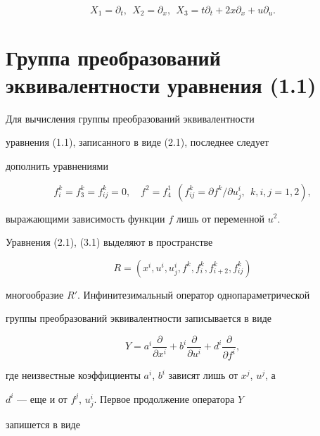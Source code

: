 $$ 


X_1=\partial_t,\ \ X_2=\partial_x,\ \ X_3=t\partial_t+ 


2x\partial_x+u\partial_u. 


$$ 


 


 


\section{Группа преобразований эквивалентности уравнения (1.1)} 


 


Для вычисления группы преобразований эквивалентности 


уравнения (1.1), записанного в виде (2.1), последнее следует 


дополнить уравнениями 


\begin{equation} 


f^k_i=f^k_3=f^k_{ij}=0,\quad f^2=f^1_4 


\ \ (f^k_{ij}=\partial f^k/\partial u^i_j,\ \ k,i,j=1,2), 


\end{equation} 


выражающими зависимость функции $f$ лишь от переменной $u^2$. 


Уравнения (2.1), (3.1) выделяют в пространстве 


$$ 


R=(x^i,u^i,u^i_j,f^k,f^k_i,f^k_{i+2},f^k_{ij}) 


$$ 


многообразие $R'$. Инфинитезимальный оператор однопараметрической 


группы преобразований эквивалентности записывается в виде 


$$ 


Y=a^i\frac{\partial}{\partial x^i}+b^i 


\frac{\partial}{\partial u^i}+d^i 


\frac{\partial}{\partial f^i}, 


$$ 


где неизвестные коэффициенты $a^i$, $b^i$ зависят лишь от $x^j$, $u^j$, а 


$d^i$ --- еще и от $f^j$, $u^i_j$. Первое продолжение оператора $Y$ 


запишется в виде 


$$ 


